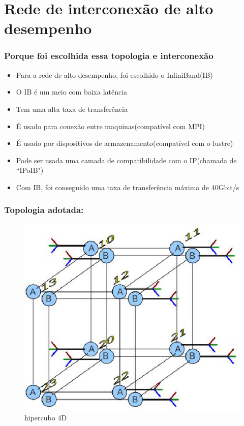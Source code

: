\documentclass[10pt]{beamer}
\begin{document}
\section{Rede de interconexão de alto desempenho}
	\begin{frame} %
	\frametitle{Porque foi escolhida essa topologia e interconexão}
		\begin{itemize}[<+->]
			\item Para a rede de alto desempenho, foi escolhido o InfiniBand(IB)
			\item O IB é um meio com baixa latência
			\item Tem uma alta taxa de transferência
			\item É usado para conexão entre maquinas(compatível com MPI)
			\item É usado por dispositivos de armazenamento(compatível com o lustre)
			\item Pode ser usada uma camada de compatibilidade com o IP(chamada de ``IPoIB")
			\item Com IB, foi conseguido uma taxa de transferência máxima de 40Gbit/s
		\end{itemize}
	\end{frame}

	\begin{frame}%
	\frametitle{Topologia adotada:}
		\begin{figure}
		\centering
			\includegraphics[scale=0.5]{./figuras/hipercubo.png}
			\caption{hipercubo 4D}
		\end{figure}
	\end{frame}
\end{document}
